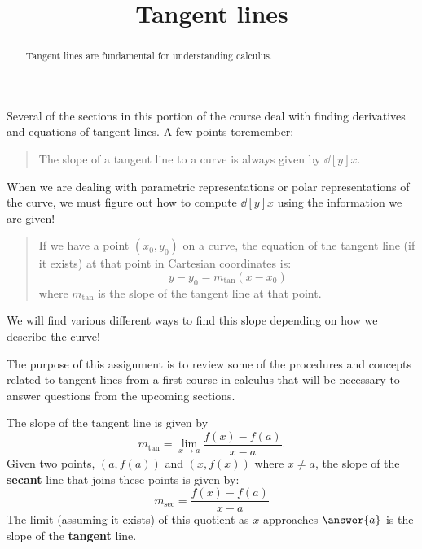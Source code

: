 \documentclass{ximera}
\title[Refresh:]{Tangent lines}
\begin{document}
\begin{abstract}
  Tangent lines are fundamental for understanding calculus.
\end{abstract}
\maketitle

\begin{problem}
  Several of the sections in this portion of the course deal with
  finding derivatives and equations of tangent lines.  A few points
  to​ remember:
  \begin{quote}
    The slope of a tangent line to a curve is always given by
    $\dd[y]{x}$.
  \end{quote}
  When we are dealing with parametric representations or polar
  representations of the​ curve, we must figure out how to compute $\dd[y]{x}$ using the
  information we are​ given!
  
  \begin{quote}
    If we have a point $(x_0, y_0)$ on a curve, the equation of the tangent line (if it exists) at that point in Cartesian coordinates is:
    \[
      y - y_0 = m_\text{tan}(x - x_0)
    \]
    where $m_\text{tan}$ is the slope of the tangent line at that point.
  \end{quote}
  We will find various different ways to find this slope depending on how we describe the curve!
    
    The purpose of this assignment is to review some of the procedures and concepts related to tangent lines from a first course in calculus that will be necessary to answer questions from the upcoming sections.
    
  \begin{multipleChoice}
  \end{multipleChoice}
\end{problem}

\begin{problem}
  The slope of the tangent line is given by
  \[
  m_\text{tan} = \lim_{x\to a} \frac{f(x) - f(a)}{x-a}.
  \]
  Given two points, $(a, f(a))$ and $(x,f(x))$ where $x\ne a$, the
  slope of the \textbf{secant} line that joins these points is given
  by:
  \[
  m_\text{sec} = \frac{f(x) - f(a)}{x-a}
  \]
  The limit (assuming it exists) of this quotient as $x$ approaches
  $\answer{a}$ is the slope of the \textbf{tangent} line.
\end{problem}
\end{document}
